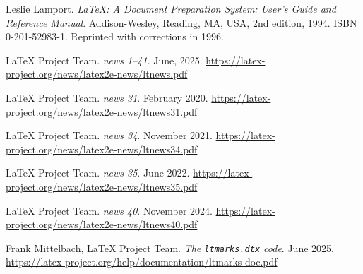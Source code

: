 \documentclass{ltnews}
\begin{document}

\begin{thebibliography}{9}\frenchspacing


Leslie Lamport.
\newblock \emph{{\LaTeX}: {A} Document Preparation System: User's Guide and Reference
  Manual}.
\newblock \mbox{Addison}-Wesley, Reading, MA, USA, 2nd edition, 1994.
\newblock ISBN 0-201-52983-1.
\newblock Reprinted with corrections in 1996.

 \LaTeX{} Project Team.
  \emph{\LaTeXe{} news 1--41}. June, 2025.
  \url{https://latex-project.org/news/latex2e-news/ltnews.pdf}

 \LaTeX{} Project Team.
  \emph{\LaTeXe{} news 31}. February 2020.
  \url{https://latex-project.org/news/latex2e-news/ltnews31.pdf}

 \LaTeX{} Project Team.
  \emph{\LaTeXe{} news 34}. November 2021.
  \url{https://latex-project.org/news/latex2e-news/ltnews34.pdf}

 \LaTeX{} Project Team.
  \emph{\LaTeXe{} news 35}. June 2022.
  \url{https://latex-project.org/news/latex2e-news/ltnews35.pdf}

 \LaTeX{} Project Team.
  \emph{\LaTeXe{} news 40}. November 2024.
  \url{https://latex-project.org/news/latex2e-news/ltnews40.pdf}

 Frank Mittelbach, \LaTeX{} Project Team.
  \emph{The \texttt{ltmarks.dtx} code}. June 2025.
  \url{https://latex-project.org/help/documentation/ltmarks-doc.pdf}

\end{thebibliography}
\end{document}
